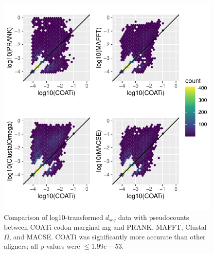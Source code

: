 \begin{figure}[!ht]
    \centering
    \includegraphics{chapter2/appendix-figures/dseq_plots_mar-mg.pdf} 
    \caption[$d_{seq}$ Marginal-MG94]{Comparison of log10-transformed $d_{seq}$ data with pseudocounts between COATi codon-marginal-mg and PRANK, MAFFT, Clustal$\Omega$, and MACSE. COATi was significantly more accurate than other aligners; all p-values were $\leq 1.99e-53$.}
    \label{fig:dseq-mar-mg}
\end{figure}

